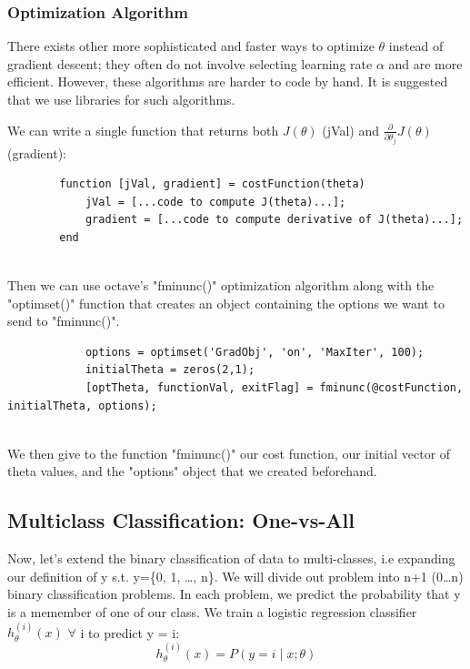         \subsubsection{Optimization Algorithm}
        There exists other more sophisticated and faster ways to optimize $\theta$ instead of gradient descent; they often do not involve selecting learning rate $\alpha$ and are more efficient. However, these algorithms are harder to code by hand. It is suggested that we use libraries for such algorithms. 

        We can write a single function that returns both  $J(\theta)$ (jVal) and  $\frac{\partial}{\partial \theta_j}J(\theta)$ (gradient):

        \begin{lstlisting}
        function [jVal, gradient] = costFunction(theta)
            jVal = [...code to compute J(theta)...];
            gradient = [...code to compute derivative of J(theta)...];
        end
            
        \end{lstlisting}

        Then we can use octave's "fminunc()" optimization algorithm along with the "optimset()" function that creates an object containing the options we want to send to "fminunc()".

        \begin{lstlisting}
            options = optimset('GradObj', 'on', 'MaxIter', 100);
            initialTheta = zeros(2,1);
            [optTheta, functionVal, exitFlag] = fminunc(@costFunction, initialTheta, options);
            
        \end{lstlisting}
        

        We then give to the function "fminunc()" our cost function, our initial vector of theta values, and the "options" object that we created beforehand.
        \subsection{Multiclass Classification: One-vs-All}
            Now, let's extend the binary classification of data to multi-classes, i.e expanding our definition of y s.t. y=\{0, 1, \ldots, n\}.
            We will divide out problem into n+1 (0\ldots n) binary classification problems. In each problem, we predict the probability that y is a memember of one of our class. We train a logistic regression classifier $h_\theta ^{(i)} (x) $ $\forall$ i to predict y = i:
            \begin{equation}
                h_\theta^{(i)} (x) = P (y=i \mid x;\theta)
                \label{eq:multiclass-logistic-classifier}
            \end{equation}

